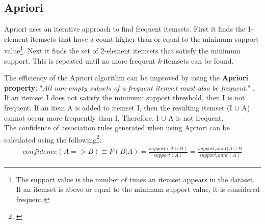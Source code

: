 \subsection{Apriori}
\label{Algo_AP}
Apriori uses an iterative approach to find frequent itemsets. First it finds the 1-element itemsets that have a count higher than or equal to the minimum support value\footnote{The support value is the number of times an itemset appears in the dataset. If an itemset is above or equal to the minimum support value, it is considered frequent.}. Next it finds the set of 2-element itemsets that satisfy the minimum support. This is repeated until no more frequent \textit{k}-itemsets can be found.

The efficiency of the Apriori algorithm can be improved by using the \textbf{Apriori property}: "\textit{All non-empty subsets of a frequent itemset must also be frequent.}" \cite[p. 249]{DataMining}. If an itemset I does not satisfy the minimum support threshold, then I is not frequent. If an item A is added to itemset I, then the resulting itemset (I $\cup$ A) cannot occur more frequently than I. Therefore, I $\cup$ A is not frequent.
\\The confidence of association rules generated when using Apriori can be calculated using the following\footnote{\cite[p. ~246]{DataMining}}:
\begin{align*}
confidence(A=>B) \equiv P(B|A) = \frac{support (A \cup B)}{support(A)} = \frac{support_count(A \cup B}{support_count(A)}
\end{align*}